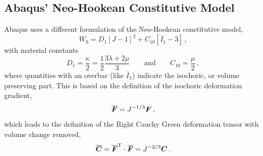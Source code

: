 \documentclass[10pt,letterpaper,oneside]{report}
\newcommand{\ten}[1]{\mbox{\boldmath $#1$}{}}
\newcommand{\scas}[1]{\mbox{{\scriptsize{${\rm{#1}}$}}}{}}
\begin{document}
\subsection{Abaqus' Neo-Hookean Constitutive Model}
Abaqus uses a different formulation of the Neo-Hookean constitutive model, 
\begin{equation}
W_0 = D_1 \left[ J - 1 \right]^2 + C_{10} \left[ \overline{I}_1 - 3 \right] \, , 
\end{equation}
with material constants  
\begin{equation}
D_1 = \frac{\kappa}{2} = \frac{1}{2} \frac{3 \lambda + 2 \mu}{3} 
\qquad \mbox{and} \qquad
C_{10} = \frac{\mu}{2} \, ,
\end{equation}
where quantities with an overbar (like $\overline{I}_1$) indicate the isochoric, or volume preserving part.  This is based on the definition of the isochoric deformation gradient,
\begin{equation}
\overline{ \ten{F} } = J^{-1/3} \ten{F} \, , 
\end{equation}
which leads to the definition of the Right Cauchy Green deformation tensor with volume change removed, 
\begin{equation}
\overline{ \ten{C} } = \overline{ \ten{F} }^{\scas{T}} \cdot \overline{ \ten{F} } = J^{-2/3} \ten{C} \, . 
\end{equation}
\end{document}
